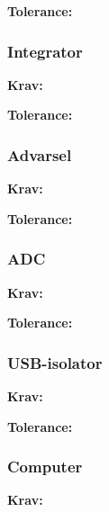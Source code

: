 \textbf{Tolerance:}
\begin{itemize}
\end{itemize}

\subsubsection{Integrator}
\textbf{Krav:}
\begin{itemize}

\end{itemize}

\textbf{Tolerance:}
\begin{itemize}
\end{itemize}

\subsubsection{Advarsel}
\textbf{Krav:}
\begin{itemize}

\end{itemize}

\textbf{Tolerance:}
\begin{itemize}
\end{itemize}

\subsubsection{ADC}
\textbf{Krav:}
\begin{itemize}

\end{itemize}

\textbf{Tolerance:}
\begin{itemize}
\end{itemize}

\subsubsection{USB-isolator}
\textbf{Krav:}
\begin{itemize}

\end{itemize}

\textbf{Tolerance:}
\begin{itemize}
\end{itemize}

\subsubsection{Computer}
\textbf{Krav:}
\begin{itemize}

\end{itemize}

